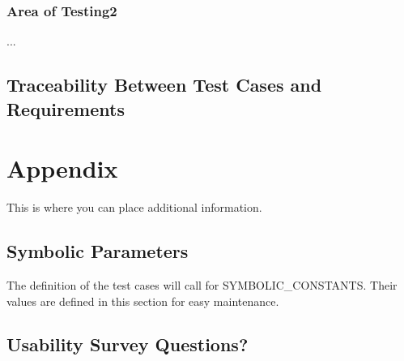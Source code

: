 \documentclass[12pt, titlepage]{article}
\begin{document}
\subsubsection{Area of Testing2}

...

\subsection{Traceability Between Test Cases and Requirements}

				




\newpage

\section{Appendix}

This is where you can place additional information.

\subsection{Symbolic Parameters}

The definition of the test cases will call for SYMBOLIC\_CONSTANTS.
Their values are defined in this section for easy maintenance.

\subsection{Usability Survey Questions?}

\end{document}
